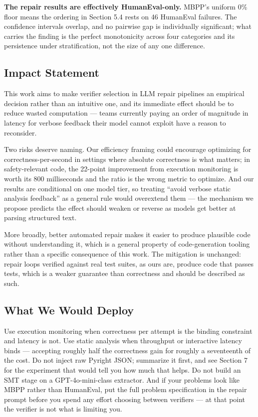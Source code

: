 \textbf{The repair results are effectively HumanEval-only.} MBPP's uniform 0\% floor means the ordering in Section 5.4 rests on 46 HumanEval failures. The confidence intervals overlap, and no pairwise gap is individually significant; what carries the finding is the perfect monotonicity across four categories and its persistence under stratification, not the size of any one difference.

\subsection{Impact Statement}

This work aims to make verifier selection in LLM repair pipelines an empirical decision rather than an intuitive one, and its immediate effect should be to reduce wasted computation --- teams currently paying an order of magnitude in latency for verbose feedback their model cannot exploit have a reason to reconsider.

Two risks deserve naming. Our efficiency framing could encourage optimizing for correctness-per-second in settings where absolute correctness is what matters; in safety-relevant code, the 22-point improvement from execution monitoring is worth its 800 milliseconds and the ratio is the wrong metric to optimize. And our results are conditional on one model tier, so treating ``avoid verbose static analysis feedback'' as a general rule would overextend them --- the mechanism we propose predicts the effect should weaken or reverse as models get better at parsing structured text.

More broadly, better automated repair makes it easier to produce plausible code without understanding it, which is a general property of code-generation tooling rather than a specific consequence of this work. The mitigation is unchanged: repair loops verified against real test suites, as ours are, produce code that passes tests, which is a weaker guarantee than correctness and should be described as such.

\subsection{What We Would Deploy}

Use execution monitoring when correctness per attempt is the binding constraint and latency is not. Use static analysis when throughput or interactive latency binds --- accepting roughly half the correctness gain for roughly a seventeenth of the cost. Do not inject raw Pyright JSON; summarize it first, and see Section 7 for the experiment that would tell you how much that helps. Do not build an SMT stage on a GPT-4o-mini-class extractor. And if your problems look like MBPP rather than HumanEval, put the full problem specification in the repair prompt before you spend any effort choosing between verifiers --- at that point the verifier is not what is limiting you.
